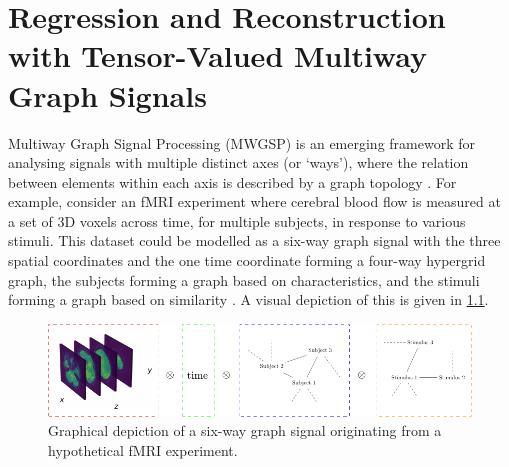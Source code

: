 

\chapter{Regression and Reconstruction with Tensor-Valued
Multiway Graph Signals}


\label{chap:nd_gsp}


Multiway Graph Signal Processing (MWGSP) is an emerging framework for analysing signals with multiple distinct axes (or `ways'), where the relation between elements within each axis is described by a graph topology \citep{Stanley2020}. For example, consider an fMRI experiment where cerebral blood flow is measured at a set of 3D voxels across time, for multiple subjects, in response to various stimuli. This dataset could be modelled as a six-way graph signal with the three spatial coordinates and the one time coordinate forming a four-way hypergrid graph, the subjects forming a graph based on characteristics, and the stimuli forming a graph based on similarity \citep{Cichocki2015}. A visual depiction of this is given in \cref{fig:fMRI_diagram}. 
 
\vspace{1.5cm}

\begin{figure}[h] 
    \begin{center}
        \includegraphics[width=\linewidth]{Figures/fMRI_Digaram.pdf}
    \end{center}
   \caption[Graphical depiction of an order-3 tensor]{Graphical depiction of a six-way graph signal originating from a hypothetical fMRI experiment. } 
    \label{fig:fMRI_diagram}
\end{figure} 


